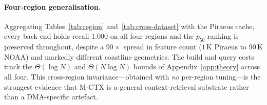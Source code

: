 \paragraph*{Four-region generalisation.}
Aggregating Tables~\ref{tab:region} and~\ref{tab:cross-dataset} with the
Piraeus cache, every back-end holds recall $1.000$ on all four regions and
the $p_{50}$ ranking is preserved throughout, despite a $90\times$ spread
in feature count ($1$\,K Piraeus to $90$\,K NOAA) and markedly different
coastline geometries. The build and query costs track the $\Theta(\log N)$
and $\Theta(N\log N)$ bounds of Appendix~\ref{app:theory} across all four.
This cross-region invariance---obtained with \emph{no} per-region
tuning---is the strongest evidence that M-CTX is a general context-retrieval
substrate rather than a DMA-specific artefact.
